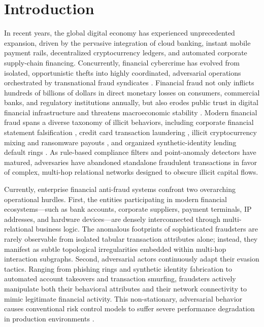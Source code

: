 \documentclass[10pt,a4paper,twocolumn]{article}
\begin{document}
\section{Introduction}

In recent years, the global digital economy has experienced unprecedented expansion, driven by the pervasive integration of cloud banking, instant mobile payment rails, decentralized cryptocurrency ledgers, and automated corporate supply-chain financing. Concurrently, financial cybercrime has evolved from isolated, opportunistic thefts into highly coordinated, adversarial operations orchestrated by transnational fraud syndicates \cite{ref1}. Financial fraud not only inflicts hundreds of billions of dollars in direct monetary losses on consumers, commercial banks, and regulatory institutions annually, but also erodes public trust in digital financial infrastructure and threatens macroeconomic stability \cite{ref2}. Modern financial fraud spans a diverse taxonomy of illicit behaviors, including corporate financial statement falsification \cite{ref41}, credit card transaction laundering \cite{ref42}, illicit cryptocurrency mixing and ransomware payouts \cite{ref43}, and organized synthetic-identity lending default rings \cite{ref44}. As rule-based compliance filters and point-anomaly detectors have matured, adversaries have abandoned standalone fraudulent transactions in favor of complex, multi-hop relational networks designed to obscure illicit capital flows.

Currently, enterprise financial anti-fraud systems confront two overarching operational hurdles. First, the entities participating in modern financial ecosystems---such as bank accounts, corporate suppliers, payment terminals, IP addresses, and hardware devices---are densely interconnected through multi-relational business logic. The anomalous footprints of sophisticated fraudsters are rarely observable from isolated tabular transaction attributes alone; instead, they manifest as subtle topological irregularities embedded within multi-hop interaction subgraphs. Second, adversarial actors continuously adapt their evasion tactics. Ranging from phishing rings and synthetic identity fabrication to automated account takeovers and transaction smurfing, fraudsters actively manipulate both their behavioral attributes and their network connectivity to mimic legitimate financial activity. This non-stationary, adversarial behavior causes conventional risk control models to suffer severe performance degradation in production environments \cite{ref3}.
\end{document}
